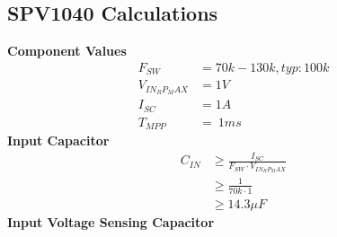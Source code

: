 \documentclass{article}
\numberwithin{figure}{section}
\numberwithin{equation}{section}
\begin{document}
{\subsection{SPV1040 Calculations}
\textbf{Component Values}
\begin{align}
  \label{eq:vals}
  F_{SW}&=70k-130k,typ:100k \\
  V_{IN_RP_MAX}&=1V \\
  I_{SC} &= 1A \\
  T_{MPP} &= ~1ms
\end{align}
\textbf{Input Capacitor}
\begin{align}
  \label{eq:incap}
  C_{IN}&\geq \frac{I_{SC}}{F_{SW}\cdot V_{IN_RP_MAX}} \\
  &\geq \frac{1}{70k\cdot 1} \\
  &\geq 14.3\mu F
\end{align}
\textbf{Input Voltage Sensing Capacitor}



\newpage
}
\end{document}
